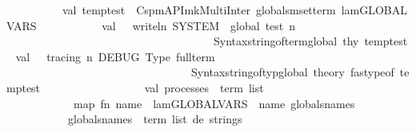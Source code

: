 \begin{isabellebody}
\isanewline
\ \ \ \ \ \ \ \ \ \ val\ temp{\isacharunderscore}{\kern0pt}test\ {\isacharequal}{\kern0pt}\ Cspm{\isacharunderscore}{\kern0pt}API{\isachardot}{\kern0pt}mk{\isacharunderscore}{\kern0pt}MultiInter\ globals{\isacharunderscore}{\kern0pt}mset{\isacharunderscore}{\kern0pt}term\ lam{\isacharunderscore}{\kern0pt}GLOBALVARS\isanewline
\ \ \ \ \ \ \ \ \ \ \ val\ {\isacharunderscore}{\kern0pt}\ {\isacharequal}{\kern0pt}\ writeln\ {\isacharparenleft}{\kern0pt}{\isachardoublequote}{\kern0pt}{\isacharbrackleft}{\kern0pt}SYSTEM{\isacharbrackright}{\kern0pt}\ \ global\ test\ {\isacharcolon}{\kern0pt}{\isacharbackslash}{\kern0pt}n\ \ {\isachardoublequote}{\kern0pt}\ {\isacharcircum}{\kern0pt}\isanewline
\ \ \ \ \ \ \ \ \ \ \ \ \ \ \ \ \ \ \ \ \ \ \ \ \ \ \ \ \ \ \ \ \ \ \ \ \ Syntax{\isachardot}{\kern0pt}string{\isacharunderscore}{\kern0pt}of{\isacharunderscore}{\kern0pt}term{\isacharunderscore}{\kern0pt}global\ thy{\isacharprime}{\kern0pt}\ temp{\isacharunderscore}{\kern0pt}test{\isacharparenright}{\kern0pt}\ \isanewline
val\ {\isacharunderscore}{\kern0pt}\ {\isacharequal}{\kern0pt}\ tracing\ {\isacharparenleft}{\kern0pt}{\isachardoublequote}{\kern0pt}{\isacharbackslash}{\kern0pt}n\ {\isacharbrackleft}{\kern0pt}DEBUG{\isacharbrackright}{\kern0pt}\ Type\ full{\isacharunderscore}{\kern0pt}term\ {\isacharequal}{\kern0pt}\ {\isachardoublequote}{\kern0pt}\ {\isacharcircum}{\kern0pt}\isanewline
\ \ \ \ \ \ \ \ \ \ \ \ \ \ \ \ \ \ \ \ \ \ \ \ \ \ \ \ \ \ \ \ \ Syntax{\isachardot}{\kern0pt}string{\isacharunderscore}{\kern0pt}of{\isacharunderscore}{\kern0pt}typ{\isacharunderscore}{\kern0pt}global\ {\isacharat}{\kern0pt}{\isacharbraceleft}{\kern0pt}theory{\isacharbraceright}{\kern0pt}\ {\isacharparenleft}{\kern0pt}fastype{\isacharunderscore}{\kern0pt}of\ {\isacharparenleft}{\kern0pt}temp{\isacharunderscore}{\kern0pt}test{\isacharparenright}{\kern0pt}\ {\isacharparenright}{\kern0pt}{\isacharparenright}{\kern0pt}\ \ \ \ \ \ \ \isanewline
\isanewline
\isanewline
\isanewline
\ \ \ \ \ \ \ \ \ \ val\ processes\ {\isacharcolon}{\kern0pt}\ term\ list\ {\isacharequal}{\kern0pt}\isanewline
\ \ \ \ \ \ \ \ \ \ \ \ map\ {\isacharparenleft}{\kern0pt}fn\ name\ {\isacharequal}{\kern0pt}{\isachargreater}{\kern0pt}\ lam{\isacharunderscore}{\kern0pt}GLOBALVARS\ {\isachardollar}{\kern0pt}\ name{\isacharparenright}{\kern0pt}\ globals{\isacharunderscore}{\kern0pt}names\isanewline
\ \ \ \ \ \ \ \ \ \ {\isacharparenleft}{\kern0pt}{\isacharasterisk}{\kern0pt}\ globals{\isacharunderscore}{\kern0pt}names\ {\isacharcolon}{\kern0pt}\ term\ list\ de\ strings\ {\isacharasterisk}{\kern0pt}{\isacharparenright}{\kern0pt}\isanewline

\end{isabellebody}
